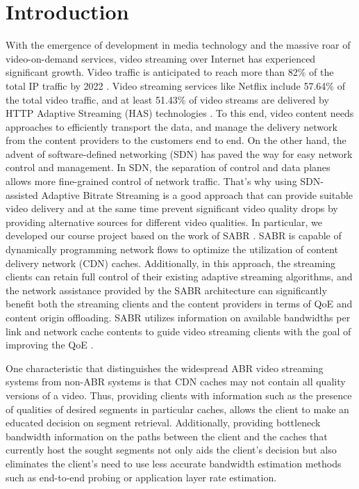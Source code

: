 \documentclass[12pt]{article}
\begin{document}
\onehalfspacing
\newpage
\tableofcontents


\doublespacing
\newpage
\section{Introduction}
With the emergence of development in media technology and the massive roar of video-on-demand services, video streaming over Internet has experienced significant growth. Video traffic is anticipated to reach more than 82\% of the total IP traffic by 2022 \cite{cisco_2018}. Video streaming services like Netflix include 57.64\% of the total video traffic, and at least 51.43\% of video streams are delivered by HTTP Adaptive Streaming (HAS) technologies \cite{survey}. To this end, video content needs approaches to efficiently transport the data, and manage the delivery network from the content providers to the customers end to end. On the other hand, the advent of software-defined networking (SDN) has paved the way for easy network control and management. In SDN, the separation of control and data planes allows more fine-grained control of network traffic. That's why using SDN-assisted Adaptive Bitrate Streaming is a good approach that can provide suitable video delivery and at the same time prevent significant video quality drops by providing alternative sources for different video qualities. In particular, we developed our course project based on the work of SABR \cite{bhat_network_2017}. SABR is capable of dynamically programming network flows to optimize the utilization of content delivery network (CDN) caches. Additionally, in this approach, the streaming clients can retain full control of their existing adaptive streaming algorithms, and the network assistance provided by the SABR architecture can significantly benefit both the streaming clients and the content providers in terms of QoE and content origin offloading. SABR utilizes information on available bandwidths per link and network cache contents to guide video streaming clients with the goal of improving the QoE \cite{bhat_network_2017}.

One characteristic that distinguishes the widespread ABR video streaming systems from non-ABR systems is that CDN caches may not contain all quality versions of a video. Thus, providing clients with information such as the presence of qualities of desired segments in particular caches, allows the client to make an educated decision on segment retrieval. Additionally, providing bottleneck bandwidth information on the paths between the client and the caches that currently host the sought segments not only aids the client's decision but also eliminates the client's need to use less accurate bandwidth estimation methods such as end-to-end probing or application layer rate estimation.
\end{document}
